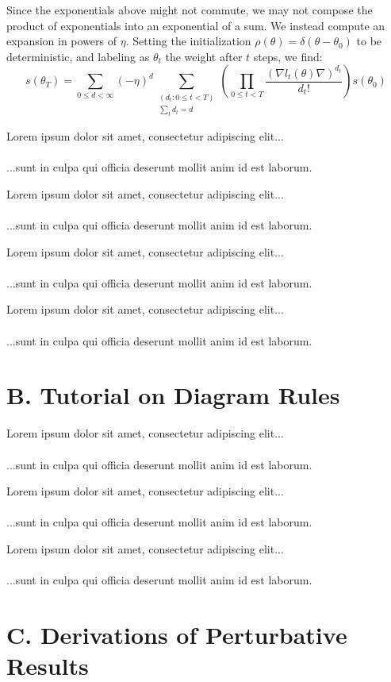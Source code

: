 \documentclass{article}
\newcommand{\lorem}[1]{
    Lorem ipsum dolor sit amet, consectetur adipiscing elit...\\
    \nopagebreak\vspace{#1cm} \ \\
    ...sunt in culpa qui officia deserunt mollit anim id est laborum.
}
\begin{document}
    Since the exponentials above might not commute, we may not compose
    the product of exponentials into an exponential of a sum.  We instead
    compute an expansion in powers of $\eta$.  Setting the initialization
    $\rho(\theta) = \delta(\theta-\theta_0)$ to be deterministic, and labeling
    as $\theta_t$ the weight after $t$ steps, we find:
    \begin{equation}\label{eq:dyson}
        s(\theta_T) =
        \sum_{0\leq d < \infty} (-\eta)^d \sum_{\substack{(d_t: 0\leq t<T) \\ \sum_t d_t = d}}
        \left(\prod_{0 \leq t < T} \frac{(\nabla l_t(\theta) \nabla)^{d_t}}{d_t!}\right) s (\theta_0)
    \end{equation}

    \lorem{3}
    \lorem{3}
    \lorem{3}
    \lorem{3}

\section*{B. Tutorial on Diagram Rules}
    \lorem{3}
    \lorem{3}
    \lorem{3}

\section*{C. Derivations of Perturbative Results}
\end{document}

